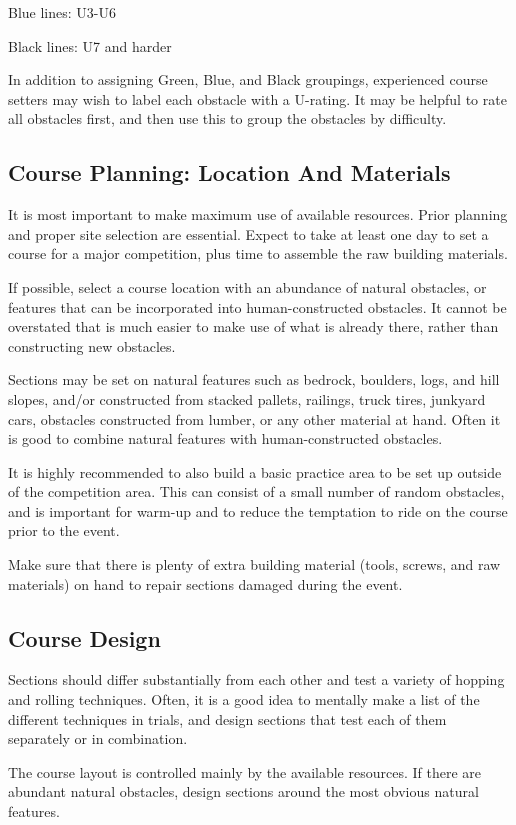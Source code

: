 Blue lines: U3-U6

Black lines: U7 and harder

In addition to assigning Green, Blue, and Black groupings, experienced course setters may wish to label each obstacle with a U-rating.
It may be helpful to rate all obstacles first, and then use this to group the obstacles by difficulty.

\subsection{Course Planning: Location And Materials}
It is most important to make maximum use of available resources.
Prior planning and proper site selection are essential.
Expect to take at least one day to set a course for a major competition, plus time to assemble the raw building materials.

If possible, select a course location with an abundance of natural obstacles, or features that can be incorporated into human-constructed obstacles.
It cannot be overstated that is much easier to make use of what is already there, rather than constructing new obstacles.

Sections may be set on natural features such as bedrock, boulders, logs, and hill slopes, and/or constructed from stacked pallets, railings, truck tires, junkyard cars, obstacles constructed from lumber, or any other material at hand.
Often it is good to combine natural features with human-constructed obstacles.

It is highly recommended to also build a basic practice area to be set up outside of the competition area.
This can consist of a small number of random obstacles, and is important for warm-up and to reduce the temptation to ride on the course prior to the event.

Make sure that there is plenty of extra building material (tools, screws, and raw materials) on hand to repair sections damaged during the event.

\subsection{Course Design}
Sections should differ substantially from each other and test a variety of hopping and rolling techniques.
Often, it is a good idea to mentally make a list of the different techniques in trials, and design sections that test each of them separately or in combination.

The course layout is controlled mainly by the available resources.
If there are abundant natural obstacles, design sections around the most obvious natural features.

